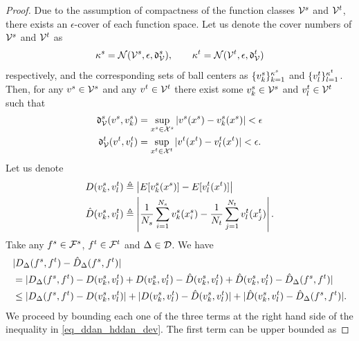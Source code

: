 \documentclass[review,supplement,onefignum,onetabnum]{siamonline250211}
\begin{document}
\begin{proof}
\label{pf_lem_ddan_hddan_dev}
Due to the assumption of compactness of the function classes $\mathcal{V}^s$ and $\mathcal{V}^t$, there exists an $\epsilon$-cover of each function space. Let us denote the cover numbers of $\mathcal{V}^s$ and $\mathcal{V}^t$ as
%
\begin{equation*}
\kappa^s = \mathcal{N}(\mathcal{V}^s, \epsilon, \mathfrak{d}^s_{\mathcal{V}} ), 
\quad \quad
\kappa^t = \mathcal{N}(\mathcal{V}^t, \epsilon, \mathfrak{d}^t_{\mathcal{V}} )
\end{equation*}
%
respectively, and the corresponding sets of ball centers as  $\{ v^s_k \}_{k=1}^{\kappa^s}$ and $\{ v^t_l \}_{l=1}^{\kappa^t}$. Then, for any $v^s \in \mathcal{V}^s$ and any $v^t \in \mathcal{V}^t$ there exist some $v^s_k \in \mathcal{V}^s$ and $v^t_l \in \mathcal{V}^t$ such that
%
\begin{equation}
\label{eq_dvs_dvt_ball_rad}
\begin{split}
\mathfrak{d}^s_{\mathcal{V}}  (v^s , v^s_k) &= \sup_{x^s \in \mathcal{X}^s}  | v^s(x^s) - v^s_k(x^s) | < \epsilon \\
\mathfrak{d}^t_{\mathcal{V}}  (v^t , v^t_l) &= \sup_{x^t \in \mathcal{X}^t}  | v^t(x^t) - v^t_l(x^t) | < \epsilon. \\
\end{split}
\end{equation}
%
Let us denote
%
\begin{equation*}
\begin{split}
D(v^s_k, v^t_l)  &\triangleq \left |  E[v^s_k(x^s)] - E[v^t_l(x^t)] \right |  \\
\hat{D}(v^s_k, v^t_l) &\triangleq
\left | 
 \frac{1}{N_s} 
  \sum_{i=1}^{N_s} v^s_k (x^s_i)
  - 
  \frac{1}{N_t} 
  \sum_{j=1}^{N_t} v^t_l (x^t_j) 
  \right |.
\end{split}
\end{equation*}
%
Take any $f^s \in \mathcal{F}^s$, $f^t \in \mathcal{F}^t$ and $\Delta \in \mathcal{D}$. We have
%
\begin{equation}
\label{eq_ddan_hddan_dev}
\begin{split}
& |  D_{\Delta}(f^s, f^t)  - \hat{D}_{\Delta}(f^s, f^t)  |  \\
&= 
|  D_{\Delta}(f^s, f^t)  - D(v^s_k, v^t_l) + D(v^s_k, v^t_l)  
- \hat{D}(v^s_k, v^t_l)  + \hat{D}(v^s_k, v^t_l) 
- \hat{D}_{\Delta}(f^s, f^t)  | \\
&\leq 
|  D_{\Delta}(f^s, f^t)  - D(v^s_k, v^t_l)  |
+
| D(v^s_k, v^t_l)  
- \hat{D}(v^s_k, v^t_l)  |
+
| \hat{D}(v^s_k, v^t_l) 
- \hat{D}_{\Delta}(f^s, f^t) | . 
\end{split}
\end{equation}
%
We proceed by bounding each one of the three terms at the right hand side of the inequality in \eqref{eq_ddan_hddan_dev}. The first term can be upper bounded as 

\end{proof}
\end{document}
